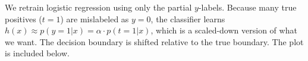 \begin{answer}
We retrain logistic regression using only the partial $y$-labels. Because many true positives ($t=1$) are mislabeled as $y=0$, the classifier learns $h(x)\approx p(y=1|x) = \alpha\cdot p(t=1|x)$, which is a scaled-down version of what we want. The decision boundary is shifted relative to the true boundary. The plot is included below.
\end{answer}
